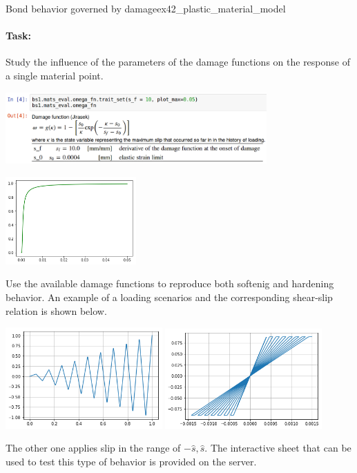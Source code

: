 \documentclass[main.tex]{subfiles}
\begin{document}
\begin{bmcsex}{Bond behavior governed by damage}{ex42_plastic_material_model}
\paragraph{Task:}
Study the influence of the parameters of the damage functions on the response of a single material point.
\begin{center}
\includegraphics[width=10cm]{fig/Lecture04/damage_jirasek.png}
\end{center}
\begin{center}
\includegraphics[width=5cm]{fig/Lecture04/damage_jirasek_function.png}
\end{center}
Use the available damage functions to reproduce both softenig and hardening behavior.
An example of a loading  scenarios and the corresponding shear-slip relation is shown below.
\begin{center}
\includegraphics[width=6cm]{fig/Lecture04/damage_jirasek_loading_scenario.png}
\includegraphics[width=6cm]{fig/Lecture04/damage_jirasek_stress_slip.png}
\end{center}
The other one applies slip in the range of $-\hat{s},\hat{s}$.
The interactive sheet that can be used to test this type of behavior is provided on the server.
\end{bmcsex}
\end{document}
